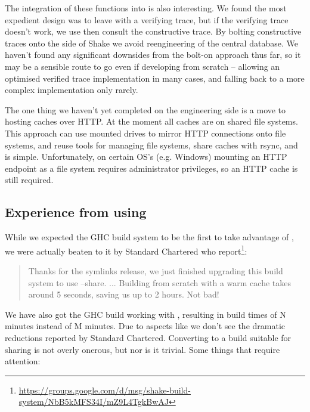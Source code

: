 The integration of these functions into \Shake is also interesting. We found the most expedient design was to leave \Shake with a verifying trace, but if the verifying trace doesn't work, we use then consult the constructive trace. By bolting constructive traces onto the side of Shake we avoid reengineering of the central database. We haven't found any significant downsides from the bolt-on approach thus far, so it may be a sensible route to go even if developing from scratch -- allowing an optimised verified trace implementation in many cases, and falling back to a more complex implementation only rarely.

The one thing we haven't yet completed on the engineering side is a move to hosting caches over HTTP. At the moment all caches are on shared file systems. This approach can use mounted drives to mirror HTTP connections onto file systems, and reuse tools for managing file systems, share caches with rsync, and is simple. Unfortunately, on certain OS's (e.g. Windows) mounting an HTTP endpoint as a file system requires administrator privileges, so an HTTP cache is still required.

\subsection{Experience from using \Cloud \Shake}

While we expected the GHC build system to be the first to take advantage of \Cloud \Shake, we were actually beaten to it by Standard Chartered who report\footnote{\url{https://groups.google.com/d/msg/shake-build-system/NbB5kMFS34I/mZ9L4TgkBwAJ}}:

\begin{quote}
Thanks for the symlinks release, we just finished upgrading this build system to use --share. ...
Building from scratch with a warm cache takes around 5 seconds, saving us up to 2 hours. Not bad!
\end{quote}

We have also got the GHC build working with \Cloud \Shake, resulting in build times of N minutes instead of M minutes. Due to aspects like  we don't see the dramatic reductions reported by Standard Chartered. Converting to a build suitable for sharing is not overly onerous, but nor is it trivial. Some things that require attention:

